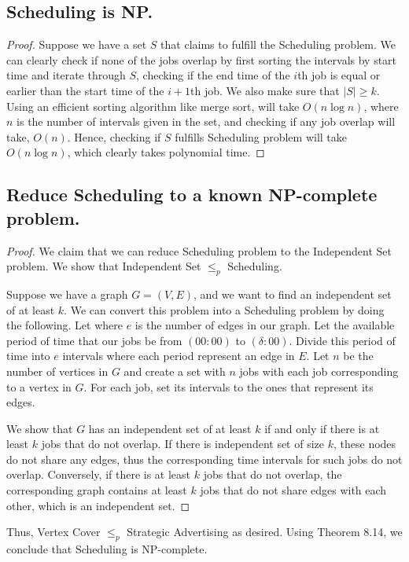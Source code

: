 \documentclass[11pt]{scrartcl}
\begin{document}
\subsection{
	Scheduling is NP.
}
\begin{proof}
	Suppose we have a set $S$ that claims to fulfill the Scheduling problem. 
	We can clearly check if none of the jobs overlap by first sorting the intervals by 
	start time and iterate through $S$, checking if the end time of the $i$th job is equal or earlier than 
	the start time of the $i+1$th job. We also make sure that $|S| \geq k$. 
	Using an efficient sorting algorithm like merge sort, will take $O(n\log n)$, where $n$ is the number of 
	intervals given in the set, 
	and checking if any job overlap will take, $O(n)$. Hence, checking if $S$ fulfills Scheduling problem
	will take $O(n\log n)$, which clearly takes polynomial time. 
\end{proof}


\subsection{
	Reduce Scheduling to a known NP-complete problem.
}
\begin{proof}
	We claim that we can reduce Scheduling problem to the Independent Set problem.
	We show that Independent Set $\leq_p$ Scheduling.

	Suppose we have a graph $G=(V,E)$, and we want to find an independent set of at least $k$.
	We can convert this problem into a Scheduling problem by doing the following. 
	Let where $e$ is the number of edges in our graph. 
	Let the available period of time that our jobs be from $(00:00)$ to $(\delta:00)$.
	Divide this period of time into $e$ intervals where each period represent an edge in $E$.
	Let $n$ be the number of vertices in $G$ and create a set with $n$ jobs with each job 
	corresponding to a vertex in $G$. For each job, set its intervals to the ones that represent its edges. 
	
	We show that $G$ has an independent set of at least $k$ if and only if there is at least $k$ jobs that do not overlap. 
	If there is independent set of size $k$, these nodes do not share any edges, thus the corresponding 
	time intervals for such jobs do not overlap. Conversely, if there is at least $k$ jobs that do not overlap, 
	the corresponding graph contains at least $k$ jobs that do not share edges with each other, which is an independent set.  
\end{proof}


Thus, Vertex Cover $\leq_p$ Strategic Advertising as desired.
Using Theorem 8.14, we conclude that Scheduling is NP-complete.
\end{document}
